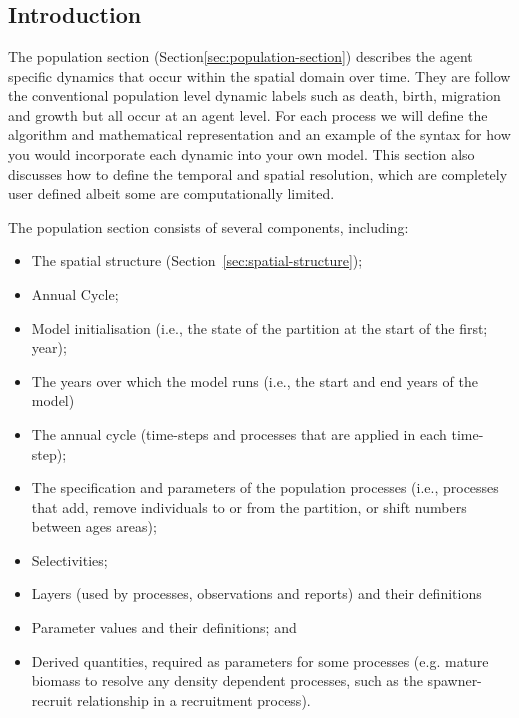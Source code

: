 \section{\label{sec:population-section}}

\subsection{Introduction}
The population section (Section\ref{sec:population-section}) describes the agent specific dynamics that occur within the spatial domain over time. They are follow the conventional population level dynamic labels such as death, birth, migration and growth but all occur at an agent level. For each process we will define the algorithm and mathematical representation and an example of the syntax for how you would incorporate each dynamic into your own model. This section also discusses how to define the temporal and spatial resolution, which are completely user defined albeit some are computationally limited.

The population section consists of several components, including:
\begin{itemize}
  \item The spatial structure (Section~\ref{sec:spatial-structure});
  \item Annual Cycle;
  \item Model initialisation (i.e., the state of the partition at the start of the first; year);
  \item The years over which the model runs (i.e., the start and end years of the model)
  \item The annual cycle (time-steps and processes that are applied in each time-step);
  \item The specification and parameters of the population processes (i.e., processes that add, remove individuals to or from the partition, or shift numbers between ages areas);
  \item Selectivities;
  \item Layers (used by processes, observations and reports) and their definitions
  \item Parameter values and their definitions; and
  \item Derived quantities, required as parameters for some processes (e.g. mature biomass to resolve any density dependent processes, such as the spawner-recruit relationship in a recruitment process).
\end{itemize}

